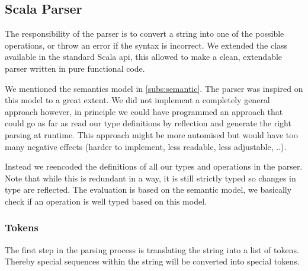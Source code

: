 \subsection{Scala Parser}

The responsibility of the parser is to convert a string into one of the possible
operations, or throw an error if the syntax is incorrect. We extended the
 class available in the standard Scala api, this
allowed to make a clean, extendable parser written in pure functional code.

\par We mentioned the semantics model in \ref{subs:semantic}. The parser was
inspired on this model to a great extent. We did not implement a completely
general approach however, in principle we could have programmed an approach that
could go as far as read our type definitions by reflection and generate the
right parsing at runtime. This approach might be more automised but would have
too many negative effects (harder to implement, less readable, less adjustable,
..).

\par
Instead we reencoded the definitions of all our types and operations in the
parser. Note that while this is redundant in a way, it is still strictly typed
so changes in type are reflected. The evaluation is based on the semantic
model, we basically check if an operation is well typed based on this model.


\subsubsection{Tokens} 

The first step in the parsing process is translating the string into
a list of tokens. Thereby special sequences within the string will be converted
into special tokens.

